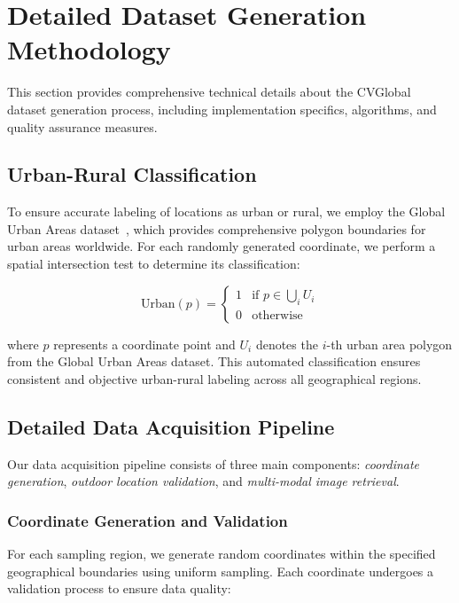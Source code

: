 \section{Detailed Dataset Generation Methodology}
\label{sec:detailed_methodology}

This section provides comprehensive technical details about the CVGlobal dataset generation process, including implementation specifics, algorithms, and quality assurance measures.

\subsection{Urban-Rural Classification}

To ensure accurate labeling of locations as urban or rural, we employ the Global Urban Areas dataset~\cite{schneider2010new}, which provides comprehensive polygon boundaries for urban areas worldwide. For each randomly generated coordinate, we perform a spatial intersection test to determine its classification:

\begin{equation}
\text{Urban}(p) = \begin{cases}
1 & \text{if } p \in \bigcup_{i} U_i \\
0 & \text{otherwise}
\end{cases}
\end{equation}

where $p$ represents a coordinate point and $U_i$ denotes the $i$-th urban area polygon from the Global Urban Areas dataset. This automated classification ensures consistent and objective urban-rural labeling across all geographical regions.

\subsection{Detailed Data Acquisition Pipeline}

Our data acquisition pipeline consists of three main components: \textit{coordinate generation}, \textit{outdoor location validation}, and \textit{multi-modal image retrieval}.

\subsubsection{Coordinate Generation and Validation}

For each sampling region, we generate random coordinates within the specified geographical boundaries using uniform sampling. Each coordinate undergoes a validation process to ensure data quality:

